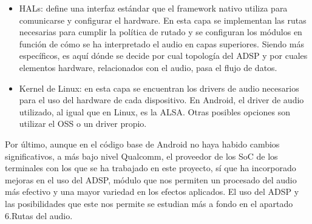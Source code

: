 \begin{itemize}
	\item{\glspl{HAL}: define una interfaz estándar que el framework nativo utiliza para comunicarse y configurar el hardware. En esta capa se implementan las rutas necesarias para cumplir la política de rutado y se configuran los módulos en función de cómo se ha interpretado el audio en capas superiores. Siendo más específicos, es aquí dónde se decide por cual topología del \gls{ADSP} y por cuales elementos hardware, relacionados con el audio, pasa el flujo de datos.}
	\item{Kernel de Linux: en esta capa se encuentran los drivers de audio necesarios para el uso del hardware de cada dispositivo. En Android, el driver de audio utilizado, al igual que en Linux, es la \gls{ALSA}. Otras posibles opciones son utilizar el \gls{OSS} o un driver propio.}
\end{itemize}


Por último, aunque en el código base de Android no haya habido cambios significativos, a más bajo nivel Qualcomm, el proveedor de los \gls{SoC} de los terminales con los que se ha trabajado en este proyecto, sí que ha incorporado mejoras en el uso del \gls{ADSP}, módulo que nos permiten un procesado del audio más efectivo y una mayor variedad en los efectos aplicados. El uso del \gls{ADSP} y las posibilidades que este nos permite se estudian más a fondo en el apartado 6.Rutas del audio. %